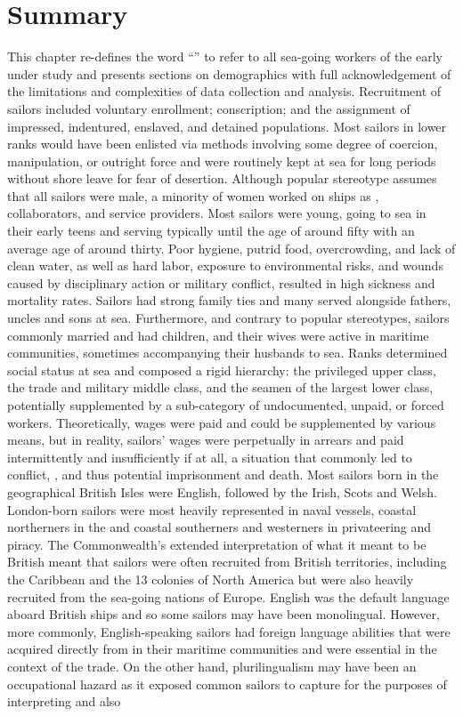 \section{{Summary}}\label{sec:3.13}

  This chapter re-defines the word “” to refer to all sea-going workers of the early  under study and presents sections on demographics with full acknowledgement of the limitations and complexities of data collection and analysis. Recruitment of sailors included voluntary enrollment; conscription; and the assignment of impressed, indentured, enslaved, and detained populations. Most sailors in lower ranks would have been enlisted via methods involving some degree of coercion, manipulation, or outright force and were routinely kept at sea for long periods without shore leave for fear of desertion. Although popular stereotype assumes that all sailors were male, a minority of women worked on ships as , collaborators, and service providers. Most sailors were young, going to sea in their early teens and serving typically until the age of around fifty with an average  age of around thirty. Poor hygiene, putrid food, overcrowding, and lack of clean water, as well as hard labor, exposure to environmental risks, and wounds caused by disciplinary action or military conflict, resulted in high sickness and mortality rates. Sailors had strong family ties and many served alongside fathers, uncles and sons at sea. Furthermore, and contrary to popular stereotypes, sailors commonly married and had children, and their wives were active in maritime communities, sometimes accompanying their husbands to sea. Ranks determined social status at sea and composed a rigid hierarchy: the privileged upper class, the trade and military middle class, and the seamen of the largest lower class, potentially supplemented by a sub-category of undocumented, unpaid, or forced workers. Theoretically, wages were paid and could be supplemented by various means, but in reality, sailors’ wages were perpetually in arrears and paid intermittently and insufficiently if at all, a situation that commonly led to conflict, , and thus potential imprisonment and death. Most sailors born in the geographical British Isles were English, followed by the Irish, Scots and Welsh.  London{}-born sailors were most heavily represented in naval vessels, coastal northerners in the  and coastal southerners and westerners in privateering and piracy. The Commonwealth’s extended interpretation of what it meant to be British meant that sailors were often recruited from British territories, including the Caribbean and the 13 colonies of North America but were also heavily recruited from the sea-going nations of Europe. English was the default language aboard British ships and so some sailors may have been monolingual. However, more commonly, English-speaking sailors had foreign language abilities that were acquired directly from  in their maritime communities and were essential in the context of the  trade. On the other hand, plurilingualism may have been an occupational hazard as it exposed common sailors to capture for the purposes of interpreting and also 